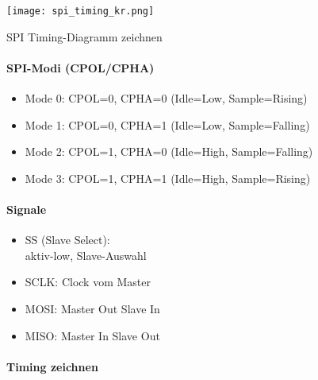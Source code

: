 \begin{center}
\texttt{[image: spi\_timing\_kr.png]}
\end{center}


\begin{KR}{SPI Timing-Diagramm zeichnen}

    \begin{minipage}{0.6\linewidth}
    \paragraph{SPI-Modi (CPOL/CPHA)}
    \begin{itemize}
        \item Mode 0: CPOL=0, CPHA=0 (Idle=Low, Sample=Rising)
        \item Mode 1: CPOL=0, CPHA=1 (Idle=Low, Sample=Falling)
        \item Mode 2: CPOL=1, CPHA=0 (Idle=High, Sample=Falling)
        \item Mode 3: CPOL=1, CPHA=1 (Idle=High, Sample=Rising)
    \end{itemize}
    \end{minipage}
    \hspace{2mm}
    \begin{minipage}{0.35\linewidth}    
    \paragraph{Signale}
    \begin{itemize}
        \item SS (Slave Select): \\ aktiv-low, Slave-Auswahl
        \item SCLK: Clock vom Master
        \item MOSI: Master Out Slave In
        \item MISO: Master In Slave Out
    \end{itemize}
    \end{minipage}
    
    \paragraph{Timing zeichnen}


\end{KR}
